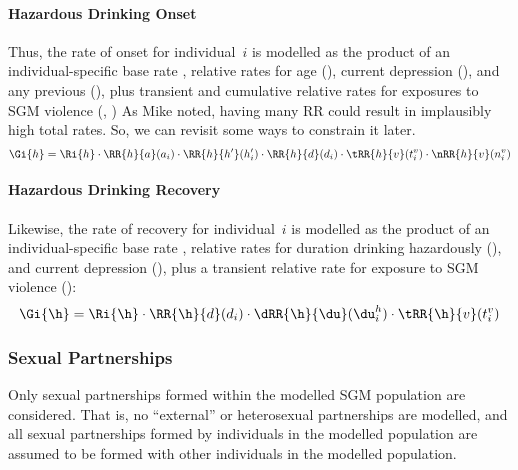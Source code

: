 \paragraph{Hazardous Drinking Onset}
Thus, the rate of \hazdrink onset for individual~$i$
is modelled as the product of
an individual-specific base rate ,
relative rates for age (),
current depression (),
and any previous \hazdrink (), plus
transient and cumulative relative rates for exposures to SGM violence
(, )
\note{:}
     {As Mike noted, having many RR could result in implausibly high total rates.
      So, we can revisit some ways to constrain it later.}
\begin{equation}
  \Gi{h} = \Ri{h}
     \cdot \RR{h}{a}(a_i)
     \cdot \RR{h}{h'}(h'_i)
     \cdot \RR{h}{d}(d_i)
     \cdot \tRR{h}{v}(t^v_i)
     \cdot \nRR{h}{v}(n^v_i)
\end{equation}
\paragraph{Hazardous Drinking Recovery}
Likewise, the rate of \hazdrink recovery for individual~$i$
is modelled as the product of
an individual-specific base rate \Ri{\h},
relative rates for duration drinking hazardously (\dRR{\h}{\du}),
and current depression (), plus
a transient relative rate for exposure to SGM violence ():
\begin{equation}
  \Gi{\h} = \Ri{\h}
    \cdot \RR{\h}{d}(d_i)
    \cdot \dRR{\h}{\du}(\du^h_i)
    \cdot \tRR{\h}{v}(t^v_i)
\end{equation}
\subsubsection{Sexual Partnerships}\label{mod.par.evt.ptr}
Only sexual partnerships formed within the modelled SGM population are considered.
That is, no ``external'' or heterosexual partnerships are modelled,
and all sexual partnerships formed by individuals in the modelled population
are assumed to be formed with other individuals in the modelled population.
